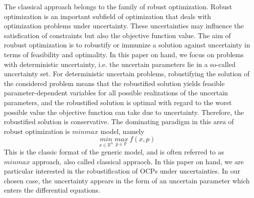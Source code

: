 \documentclass  [
  paper    = a4,
  BCOR     = 10mm,
  twoside,
  fontsize = 12pt,
  fleqn,
  toc      = bibnumbered,
  toc      = listofnumbered,
  numbers  = noendperiod,
  headings = normal,
  listof   = leveldown,
  version  = 3.03
]                                       {scrreprt}
\newcommand{\<}{\langle}
\renewcommand{\>}{\rangle}
\begin{document}
The classical approach belongs to the family of robust optimization. Robust optimization is an important subfield of optimization that deals with optimization problems under uncertainty. These uncertainties may influence the satisfication of constraints but also the objective function value. The aim of roubust optimization is to robustify or immunize a solution against uncertainty in terms of feasibility and optimality.  In this paper on hand, we focus on problems with deterministic uncertainty, i.e. the uncertain parameters lie in a so-called uncertainty set. For deterministic uncertain problems, robustifying the solution of the considered problem means that the robustified solution yields feasible parameter-dependent variables for all possible realizations of the uncertain parameters, and the robustified solution is optimal with regard to the worst possible value the objective function can take due to uncertainty. Therefore, the robustified solution is conservative. The dominating paradigm in this area of robust optimization is $minmax$ model, namely
\begin{equation}
	\underset{x \in \mathbb{R}^n}{min} \   \underset{p \in \mathbb{P}}{max}  \  f(x,p) 
\end{equation}
This is the classic format of the generic model, and is often referred to as $minmax$ approach, also called classical appraoch. 
In this paper on hand, we are particular interested in the robustification of OCPs under uncertainties. In our chosen case, the uncertainty appears in the form of an uncertain parameter which enters the differential equations.
\end{document}
